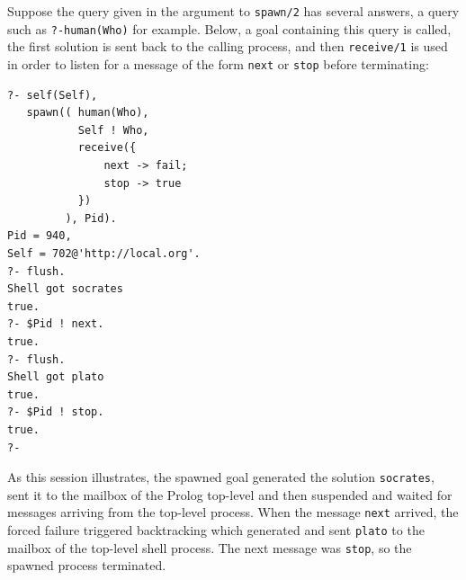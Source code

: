 \documentclass{tlp}
\begin{document}
%
%

\noindent Suppose the query given in the argument to \texttt{spawn/2} has several answers, a query such as \texttt{?-human(Who)} for example. Below, a goal containing this query is called, the first solution is sent back to the calling process, and then \texttt{receive/1} is used in order to listen for a message of the form \texttt{next} or \texttt{stop} before terminating:

\begin{lstlisting}
?- self(Self),
   spawn(( human(Who),
           Self ! Who,
           receive({
               next -> fail;
               stop -> true
           })
         ), Pid).
Pid = 940,
Self = 702@'http://local.org'.
?- flush.
Shell got socrates
true.
?- $Pid ! next.
true.
?- flush.
Shell got plato
true.
?- $Pid ! stop.
true.
?-
\end{lstlisting}

\noindent As this session illustrates, the spawned goal generated the solution \texttt{socrates}, sent it to the mailbox of the Prolog top-level and then suspended and waited for messages arriving from the top-level process. When the message \texttt{next} arrived, the forced failure triggered backtracking which generated and sent \texttt{plato} to the mailbox of the top-level shell process. The next message was \texttt{stop}, so the spawned process terminated.
\end{document}
